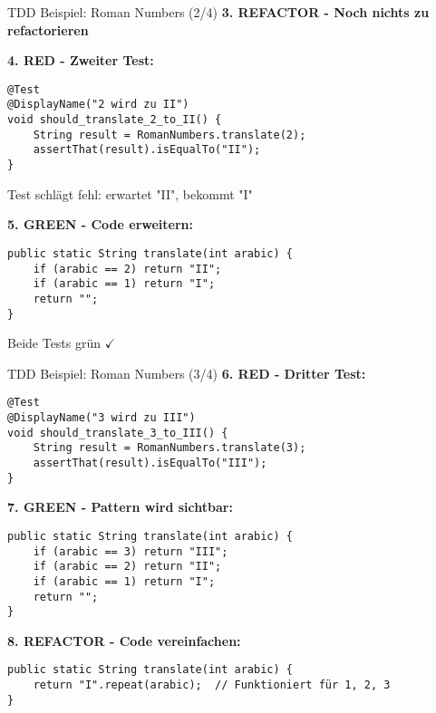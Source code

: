 \begin{frame}[fragile]{TDD Beispiel: Roman Numbers (2/4)}
  \textbf{3. REFACTOR - Noch nichts zu refactorieren}

  \textbf{4. RED - Zweiter Test:}
  \begin{lstlisting}[style=java, basicstyle=\footnotesize\ttfamily]
@Test
@DisplayName("2 wird zu II")
void should_translate_2_to_II() {
    String result = RomanNumbers.translate(2);
    assertThat(result).isEqualTo("II");
}
  \end{lstlisting}

  Test schlägt fehl: erwartet "II", bekommt "I"

  \textbf{5. GREEN - Code erweitern:}
  \begin{lstlisting}[style=java, basicstyle=\tiny\ttfamily]
public static String translate(int arabic) {
    if (arabic == 2) return "II";
    if (arabic == 1) return "I";
    return "";
}
  \end{lstlisting}

  Beide Tests grün $\checkmark$
\end{frame}

\begin{frame}[fragile]{TDD Beispiel: Roman Numbers (3/4)}
  \textbf{6. RED - Dritter Test:}
  \begin{lstlisting}[style=java, basicstyle=\tiny\ttfamily]
@Test
@DisplayName("3 wird zu III")
void should_translate_3_to_III() {
    String result = RomanNumbers.translate(3);
    assertThat(result).isEqualTo("III");
}
  \end{lstlisting}

  \textbf{7. GREEN - Pattern wird sichtbar:}
  \begin{lstlisting}[style=java, basicstyle=\tiny\ttfamily]
public static String translate(int arabic) {
    if (arabic == 3) return "III";
    if (arabic == 2) return "II";
    if (arabic == 1) return "I";
    return "";
}
  \end{lstlisting}

  \textbf{8. REFACTOR - Code vereinfachen:}
  \begin{lstlisting}[style=java, basicstyle=\tiny\ttfamily]
public static String translate(int arabic) {
    return "I".repeat(arabic);  // Funktioniert für 1, 2, 3
}
  \end{lstlisting}
\end{frame}

